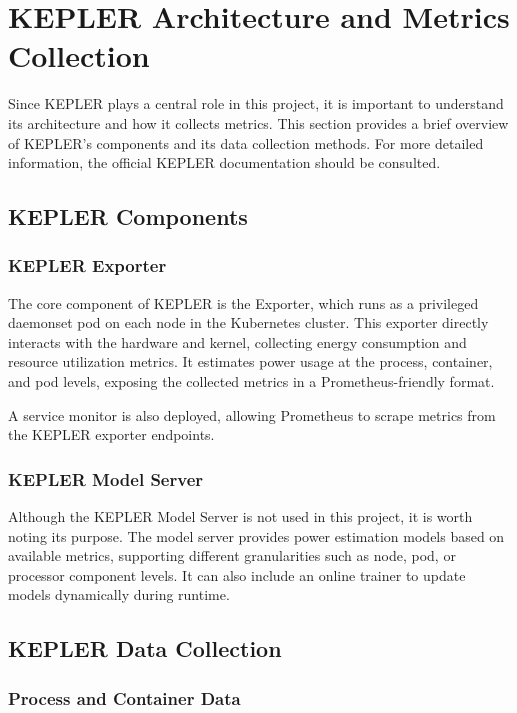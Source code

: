 \section{KEPLER Architecture and Metrics Collection} \label{KEPLER_architecture_chapter}

Since KEPLER plays a central role in this project, it is important to understand its architecture and how it collects metrics. This section provides a brief overview of KEPLER’s components and its data collection methods. For more detailed information, the official KEPLER documentation\parencite{KEPLERDocumentation} should be consulted.

\subsection{KEPLER Components}

\subsubsection{KEPLER Exporter}

The core component of KEPLER is the Exporter, which runs as a privileged daemonset pod on each node in the Kubernetes cluster. This exporter directly interacts with the hardware and kernel, collecting energy consumption and resource utilization metrics. It estimates power usage at the process, container, and pod levels, exposing the collected metrics in a Prometheus-friendly format.

A service monitor is also deployed, allowing Prometheus to scrape metrics from the KEPLER exporter endpoints.

\subsubsection{KEPLER Model Server}

Although the KEPLER Model Server is not used in this project, it is worth noting its purpose. The model server provides power estimation models based on available metrics, supporting different granularities such as node, pod, or processor component levels. It can also include an online trainer to update models dynamically during runtime.

\subsection{KEPLER Data Collection}

\subsubsection{Process and Container Data}

